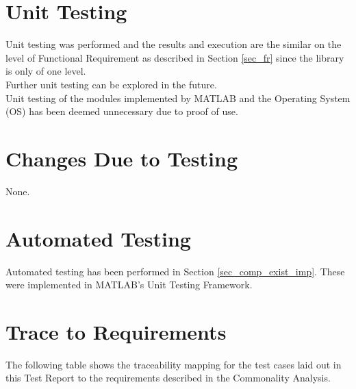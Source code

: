 \documentclass[12pt, titlepage]{article}
\begin{document}
\section{Unit Testing} \label{sec_ut}
Unit testing was performed and the results and execution are the similar
on the level of Functional Requirement as described in Section \ref{sec_fr}
since the library is only of one level.\\

Further unit testing can be explored in the future.\\

Unit testing of the modules implemented by MATLAB and the Operating System (OS)
has been deemed unnecessary due to proof of use.

\section{Changes Due to Testing} \label{sec_changes}

None.

\section{Automated Testing} \label{sec_at}

Automated testing has been performed in Section \ref{sec_comp_exist_imp}.
These were implemented in MATLAB's Unit Testing Framework.
		
\section{Trace to Requirements} \label{sec_trace_req}

The following table shows the traceability mapping for the test cases laid out in this Test Report to the requirements 
described in the Commonality Analysis.
\end{document}
